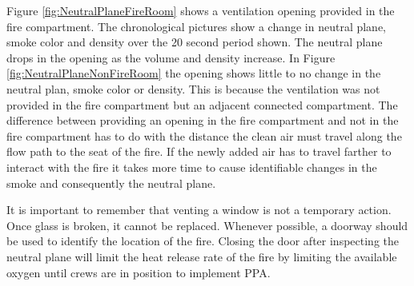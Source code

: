 \documentclass{article}
\begin{document}
Figure \ref{fig:NeutralPlaneFireRoom} shows a ventilation opening provided in the fire compartment. The chronological pictures show a change in neutral plane, smoke color and density over the 20 second period shown. The neutral plane drops in the opening as the volume and density increase. In Figure \ref{fig:NeutralPlaneNonFireRoom} the opening shows little to no change in the neutral plan, smoke color or density. This is because the ventilation was not provided in the fire compartment but an adjacent connected compartment. The difference between providing an opening in the fire compartment and not in the fire compartment has to do with the distance the clean air must travel along the flow path to the seat of the fire. If the newly added air has to travel farther to interact with the fire it takes more time to cause identifiable changes in the smoke and consequently the neutral plane.

It is important to remember that venting a window is not a temporary action. Once glass is broken, it cannot be replaced. Whenever possible, a doorway should be used to identify the location of the fire. Closing the door after inspecting the neutral plane will  limit the heat release rate of the fire by limiting the available oxygen until crews are in position to implement PPA. 
\end{document}

